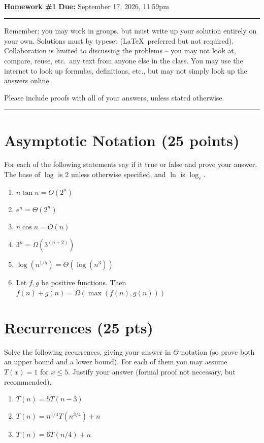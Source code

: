 \documentclass[11pt]{article}
\begin{document}
\\
{{\bf Homework \#1}} \hfill {{\bf Due:} September 17, 2026, 11:59pm} \\
\rule[0.1in]{\textwidth}{0.4pt}

Remember: you may work in groups, but must write up your solution entirely on your own.  Solutions must by typeset (\LaTeX\ preferred but not required).  Collaboration is limited to discussing the problems -- you may not look at, compare, reuse, etc.~any text from anyone else in the class.  You may use the internet to look up formulas, definitions, etc., but may not simply look up the answers online.  

Please include proofs with all of your answers, unless stated otherwise.

\noindent \rule[0.1in]{\textwidth}{0.4pt}

\section{Asymptotic Notation (25 points)}

For each of the following statements say if it true or false and prove your answer.  The base of $\log$ is $2$ unless otherwise specified, and $\ln$ is $\log_e$.

\begin{enumerate}
\item  $n \tan n = O(2^n)$
\item $e^n = \Theta(2^{n})$
\item $n \cos n = O(n)$
\item $3^n = \Omega(3^{(n+2)})$
\item $\log(n^{1/5}) = \Theta(\log (n^{3}))$
\item Let $f,g$ be positive functions. Then $f(n)+g(n) = \Omega(\max(f(n),g(n)))$
\end{enumerate}


\section{Recurrences (25 pts)}

Solve the following recurrences, giving your answer in $\Theta$ notation (so prove both an upper bound and a lower bound).  For each of them you may assume $T(x) = 1$ for $x \leq 5$.   Justify your answer (formal proof not necessary, but recommended).

\begin{enumerate}
\item $T(n) = 5 T(n-3)$
\item $T(n) = n^{1/4} T(n^{3/4}) + n$
\item $T(n) = 6 T(n/4) + n$
\end{enumerate}
\end{document}
